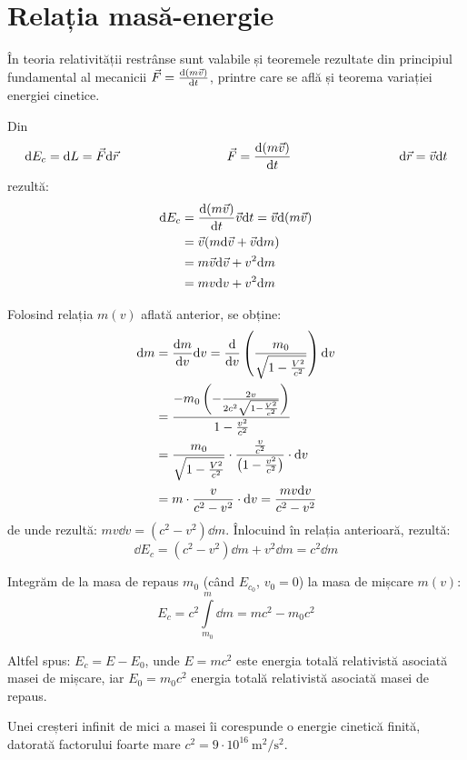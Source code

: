 \section{Relația masă-energie}

În teoria relativității restrânse sunt valabile și teoremele rezultate
din principiul fundamental al mecanicii \( \vec{F} = \frac{\mathrm{d}(m\vec{v})}{\mathrm{d}t} \),
printre care se află și teorema variației energiei cinetice.

Din
\[
    \dd E_c = \dd L = \vec{F}\dd\vec{r}
    \hspace{3cm}
    \vec{F} = \diff{(m\vec{v})}{t}
    \hspace{3cm}
    \dd\vec{r} = \vec{v} \dd t
\]
rezultă:
\begin{align*}
    \mathrm{d} E_c &= \frac{\mathrm{d}(m\vec{v})}{\mathrm{d}t} \vec{v}\mathrm{d} t = \vec{v} \mathrm{d}(m\vec{v}) \\
            &= \vec{v} (m\mathrm{d}\vec{v} + \vec{v} \mathrm{d} m) \\
            &= m\vec{v}\mathrm{d}\vec{v} + v^2 \mathrm{d} m \\
            &= mv \mathrm{d} v + v^2 \mathrm{d} m
\end{align*}

Folosind relația $m(v)$ aflată anterior, se obține:
\begin{align*}
    \mathrm{d} m &= \frac{\mathrm{d}m}{\mathrm{d}v} \mathrm{d} v = \frac{\mathrm{d}}{\mathrm{d} v} \left(\frac{m_0}{\sqrt{1 - \frac{V^2}{c^2}}}\right) \mathrm{d} v \\
          &= \frac{-m_0 \left(-\frac{2v}{2c^2\sqrt{1 - \frac{V^2}{c^2}}}\right)}{1 - \frac{v^2}{c^2}} \\
          &= \frac{m_0}{\sqrt{1 - \frac{V^2}{c^2}}} \cdot \frac{\frac{v}{c^2}}{\left(1 - \frac{v^2}{c^2}\right)} \cdot\mathrm{d} v \\
          &= m \cdot \frac{v}{c^2 - v^2} \cdot\mathrm{d} v = \frac{mv \mathrm{d} v}{c^2 - v^2}
\end{align*}
de unde rezultă: \( mv \dd v = (c^2 - v^2) \dd m \). Înlocuind în relația anterioară, rezultă:
\[ \dd E_c = (c^2 - v^2) \dd m + v^2 \dd m = c^2 \dd m \]

Integrăm de la masa de repaus $m_0$ (când $E_{c_0}$, $v_0 = 0$) la masa de mișcare $m(v)$:
\[ E_c = c^2 \int\limits_{m_0}^m \dd m = mc^2 - m_0c^2 \]

Altfel spus: \( E_c = E - E_0 \), unde \( E = mc^2 \) este energia totală
relativistă asociată masei de mișcare, iar \( E_0 = m_0c^2 \) energia
totală relativistă asociată masei de repaus.

Unei creșteri infinit de mici a masei îi corespunde o energie cinetică
finită, datorată factorului foarte mare \( c^2 = 9 \cdot 10^{16} ~ \mathrm{m^2/s^2} \).

